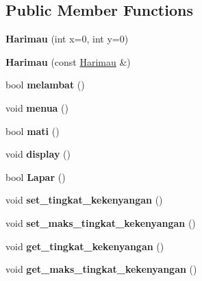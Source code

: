 \subsection*{Public Member Functions}
\begin{DoxyCompactItemize}
\item 
{\bfseries Harimau} (int x=0, int y=0)\hypertarget{class_harimau_ab45a57538275467b9ce049107f0e16c5}{}\label{class_harimau_ab45a57538275467b9ce049107f0e16c5}

\item 
{\bfseries Harimau} (const \hyperlink{class_harimau}{Harimau} \&)\hypertarget{class_harimau_a0c9d5174a7f6b6bfaa3e7b5c009b32dc}{}\label{class_harimau_a0c9d5174a7f6b6bfaa3e7b5c009b32dc}

\item 
bool {\bfseries melambat} ()\hypertarget{class_harimau_a5e2949d520df0978cecab066a1d300f6}{}\label{class_harimau_a5e2949d520df0978cecab066a1d300f6}

\item 
void {\bfseries menua} ()\hypertarget{class_harimau_a1d0276008f536b10cb045530104fdcf7}{}\label{class_harimau_a1d0276008f536b10cb045530104fdcf7}

\item 
bool {\bfseries mati} ()\hypertarget{class_harimau_a4d141f08a5514ff45493efcd4fdb902d}{}\label{class_harimau_a4d141f08a5514ff45493efcd4fdb902d}

\item 
void {\bfseries display} ()\hypertarget{class_harimau_a63e4b1698384423df35b90159c84305c}{}\label{class_harimau_a63e4b1698384423df35b90159c84305c}

\item 
bool {\bfseries Lapar} ()\hypertarget{class_harimau_aa2ab17279c6f573cc08ff374f3418c4f}{}\label{class_harimau_aa2ab17279c6f573cc08ff374f3418c4f}

\item 
void {\bfseries set\+\_\+tingkat\+\_\+kekenyangan} ()\hypertarget{class_harimau_abf1f1929764e17f548ae6f27a6f45c4f}{}\label{class_harimau_abf1f1929764e17f548ae6f27a6f45c4f}

\item 
void {\bfseries set\+\_\+maks\+\_\+tingkat\+\_\+kekenyangan} ()\hypertarget{class_harimau_af9eb25e5c92c2b0a42f4279996f341fb}{}\label{class_harimau_af9eb25e5c92c2b0a42f4279996f341fb}

\item 
void {\bfseries get\+\_\+tingkat\+\_\+kekenyangan} ()\hypertarget{class_harimau_a88721c4a5de692e2642fb9b4dc7a098b}{}\label{class_harimau_a88721c4a5de692e2642fb9b4dc7a098b}

\item 
void {\bfseries get\+\_\+maks\+\_\+tingkat\+\_\+kekenyangan} ()\hypertarget{class_harimau_a503b45f1cd3496e27381774dff50077d}{}\label{class_harimau_a503b45f1cd3496e27381774dff50077d}

\end{DoxyCompactItemize}
